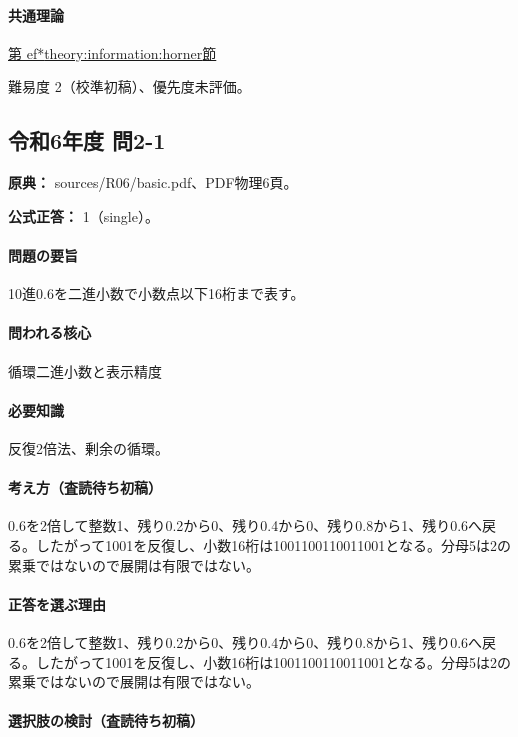 \paragraph{共通理論} \hyperref[theory:information:horner]{第
ef*{theory:information:horner}節}

\par 難易度 2（校準初稿）、優先度未評価。

\subsection{令和6年度 問2-1}
\label{q:r06-reg-basic-2-1}

\noindent\textbf{原典：} sources/R06/basic.pdf、PDF物理6頁。

\textbf{公式正答：} 1（single）。

\paragraph{問題の要旨} 10進0.6を二進小数で小数点以下16桁まで表す。

\paragraph{問われる核心} 循環二進小数と表示精度

\paragraph{必要知識} 反復2倍法、剰余の循環。

\paragraph{考え方（査読待ち初稿）} 0.6を2倍して整数1、残り0.2から0、残り0.4から0、残り0.8から1、残り0.6へ戻る。したがって1001を反復し、小数16桁は1001100110011001となる。分母5は2の累乗ではないので展開は有限ではない。

\paragraph{正答を選ぶ理由} 0.6を2倍して整数1、残り0.2から0、残り0.4から0、残り0.8から1、残り0.6へ戻る。したがって1001を反復し、小数16桁は1001100110011001となる。分母5は2の累乗ではないので展開は有限ではない。

\paragraph{選択肢の検討（査読待ち初稿）}


